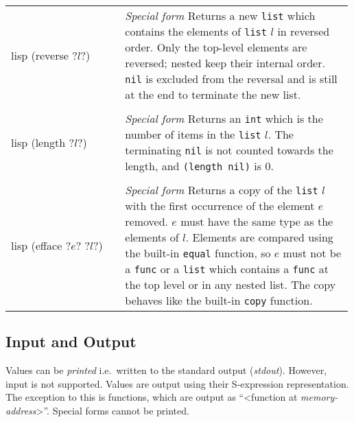 \documentclass[a4paper, 12pt]{article}
\makeatletter
\newenvironment{funcdefs}
    {\begin{longtable}{@{} x{0.33\linewidth} @{} >{\raggedright\arraybackslash}p{0.66\linewidth} @{}}}
    {\end{longtable}}
\def\specialf/{\textit{Special form}\hspace{0.5em}}
\makeatother
\begin{document}
\begin{funcdefs}
\begin{minipage}[t]{\linewidth}
\begin{cminted}[autogobble=true, escapeinside=??]{lisp}
            (reverse ?$l$?)
        \end{cminted}
    \end{minipage}
    & \specialf/ Returns a new \texttt{list} which contains the elements of \texttt{list} $l$ in reversed order. Only the top-level elements are reversed; nested keep their internal order. \texttt{nil} is excluded from the reversal and is still at the end to terminate the new list.
    \\ \\
    \begin{minipage}[t]{\linewidth}
        \centering
        \begin{cminted}[autogobble=true, escapeinside=??]{lisp}
            (length ?$l$?)
        \end{cminted}
    \end{minipage}
    & \specialf/ Returns an \texttt{int} which is the number of items in the \texttt{list} $l$. The terminating \texttt{nil} is not counted towards the length, and \texttt{(length nil)} is 0.
    \\ \\
    \begin{minipage}[t]{\linewidth}
        \centering
        \begin{cminted}[autogobble=true, escapeinside=??]{lisp}
            (efface ?$e$? ?$l$?)
        \end{cminted}
    \end{minipage}
    & \specialf/ Returns a copy of the \texttt{list} $l$ with the first occurrence of the element $e$ removed. $e$ must have the same type as the elements of $l$. Elements are compared using the built-in \texttt{equal} function, so $e$ must not be a \texttt{func} or a \texttt{list} which contains a \texttt{func} at the top level or in any nested list. The copy behaves like the built-in \texttt{copy} function.
\end{funcdefs}

\subsection{Input and Output}
Values can be \textit{printed} i.e.\ written to the standard output (\textit{stdout}). However, input is not supported. Values are output using their S-expression representation. The exception to this is functions, which are output as ``<function at \textit{memory-address}>''. Special forms cannot be printed.
\end{document}
